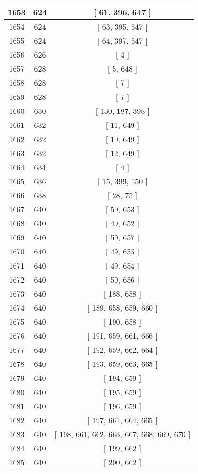 \begin{center}
\begin{longtable}[H]{|| c c c ||}
\hline
1653 & 624 & [ 61, 396, 647 ] \\ 
\hline
1654 & 624 & [ 63, 395, 647 ] \\ 
\hline
1655 & 624 & [ 64, 397, 647 ] \\ 
\hline
1656 & 626 & [ 4 ] \\ 
\hline
1657 & 628 & [ 5, 648 ] \\ 
\hline
1658 & 628 & [ 7 ] \\ 
\hline
1659 & 628 & [ 7 ] \\ 
\hline
1660 & 630 & [ 130, 187, 398 ] \\ 
\hline
1661 & 632 & [ 11, 649 ] \\ 
\hline
1662 & 632 & [ 10, 649 ] \\ 
\hline
1663 & 632 & [ 12, 649 ] \\ 
\hline
1664 & 634 & [ 4 ] \\ 
\hline
1665 & 636 & [ 15, 399, 650 ] \\ 
\hline
1666 & 638 & [ 28, 75 ] \\ 
\hline
1667 & 640 & [ 50, 653 ] \\ 
\hline
1668 & 640 & [ 49, 652 ] \\ 
\hline
1669 & 640 & [ 50, 657 ] \\ 
\hline
1670 & 640 & [ 49, 655 ] \\ 
\hline
1671 & 640 & [ 49, 654 ] \\ 
\hline
1672 & 640 & [ 50, 656 ] \\ 
\hline
1673 & 640 & [ 188, 658 ] \\ 
\hline
1674 & 640 & [ 189, 658, 659, 660 ] \\ 
\hline
1675 & 640 & [ 190, 658 ] \\ 
\hline
1676 & 640 & [ 191, 659, 661, 666 ] \\ 
\hline
1677 & 640 & [ 192, 659, 662, 664 ] \\ 
\hline
1678 & 640 & [ 193, 659, 663, 665 ] \\ 
\hline
1679 & 640 & [ 194, 659 ] \\ 
\hline
1680 & 640 & [ 195, 659 ] \\ 
\hline
1681 & 640 & [ 196, 659 ] \\ 
\hline
1682 & 640 & [ 197, 661, 664, 665 ] \\ 
\hline
1683 & 640 & [ 198, 661, 662, 663, 667, 668, 669, 670 ] \\ 
\hline
1684 & 640 & [ 199, 662 ] \\ 
\hline
1685 & 640 & [ 200, 662 ] \\ 

\end{longtable}
\end{center}
